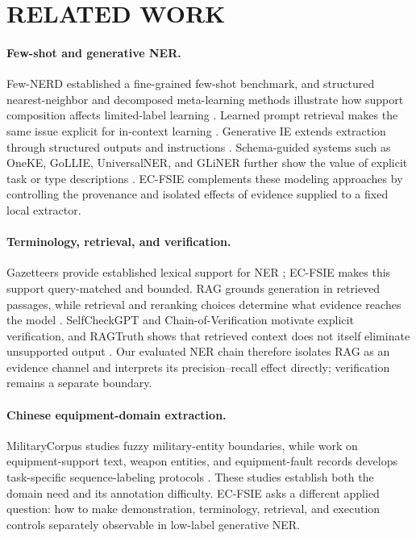 \section{RELATED WORK}

\paragraph{Few-shot and generative NER.}
Few-NERD established a fine-grained few-shot benchmark, and structured
nearest-neighbor and decomposed meta-learning methods illustrate how support
composition affects limited-label learning
\cite{ding2021fewnerd,yang2020structured,ma2022decomposed}. Learned prompt
retrieval makes the same issue explicit for in-context learning
\cite{rubin2022promptretrieval}. Generative IE extends extraction through
structured outputs and instructions
\cite{xu2024llmiesurvey,lu2022uie,wang2023instructuie,wang2023gptner}.
Schema-guided systems such as OneKE, GoLLIE, UniversalNER, and GLiNER further
show the value of explicit task or type descriptions
\cite{luo2025oneke,sainz2024gollie,zhou2024universalner,zaratiana2024gliner}.
EC-FSIE complements these modeling approaches by controlling the provenance
and isolated effects of evidence supplied to a fixed local extractor.

\paragraph{Terminology, retrieval, and verification.}
Gazetteers provide established lexical support for NER
\cite{liu2019gazetteers}; EC-FSIE makes this support query-matched and bounded.
RAG grounds generation in retrieved passages, while retrieval and reranking
choices determine what evidence reaches the model
\cite{lewis2020rag,gao2023ragsurvey}. SelfCheckGPT and Chain-of-Verification
motivate explicit verification, and RAGTruth shows that retrieved context does
not itself eliminate unsupported output
\cite{manakul2023selfcheckgpt,dhuliawala2024cove,niu2024ragtruth}. Our evaluated
NER chain therefore isolates RAG as an evidence channel and interprets its
precision--recall effect directly; verification remains a separate boundary.

\paragraph{Chinese equipment-domain extraction.}
MilitaryCorpus studies fuzzy military-entity boundaries, while work on
equipment-support text, weapon entities, and equipment-fault records develops
task-specific sequence-labeling protocols
\cite{yin2020militaryner,liu2021equipmentsupport,guo2023militaryweapons,gao2024equipmentfaultner}.
These studies establish both the domain need and its annotation difficulty.
EC-FSIE asks a different applied question: how to make demonstration,
terminology, retrieval, and execution controls separately observable in
low-label generative NER.

